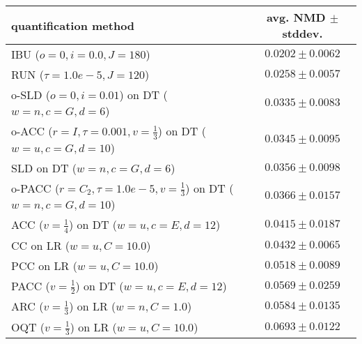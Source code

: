 \begin{tabular}{lc}
  \toprule
  quantification method & avg. NMD $\pm$ stddev. \\
  \midrule
  IBU ($o=0, i=0.0, J=180$) & $\mathbf{0.0202 \pm 0.0062}$ \\
  RUN ($\tau=1.0e-5, J=120$) & $0.0258 \pm 0.0057$ \\
  o-SLD ($o=0, i=0.01$) on DT ($w=n, c=G, d=6$) & $0.0335 \pm 0.0083$ \\
  o-ACC ($r=I, \tau=0.001, v=\frac{1}{3}$) on DT ($w=u, c=G, d=10$) & $0.0345 \pm 0.0095$ \\
  SLD on DT ($w=n, c=G, d=6$) & $0.0356 \pm 0.0098$ \\
  o-PACC ($r=C_2, \tau=1.0e-5, v=\frac{1}{3}$) on DT ($w=n, c=G, d=10$) & $0.0366 \pm 0.0157$ \\
  ACC ($v=\frac{1}{4}$) on DT ($w=u, c=E, d=12$) & $0.0415 \pm 0.0187$ \\
  CC on LR ($w=u, C=10.0$) & $0.0432 \pm 0.0065$ \\
  PCC on LR ($w=u, C=10.0$) & $0.0518 \pm 0.0089$ \\
  PACC ($v=\frac{1}{2}$) on DT ($w=u, c=E, d=12$) & $0.0569 \pm 0.0259$ \\
  ARC ($v=\frac{1}{3}$) on LR ($w=n, C=1.0$) & $0.0584 \pm 0.0135$ \\
  OQT ($v=\frac{1}{3}$) on LR ($w=u, C=10.0$) & $0.0693 \pm 0.0122$ \\
  \bottomrule
\end{tabular}
